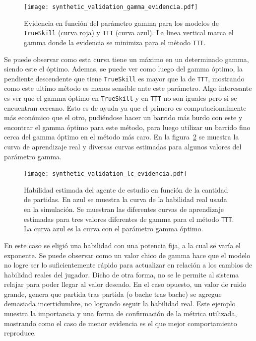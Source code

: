 \documentclass[11pt,twoside,spanish]{report} %
\begin{document}
\begin{figure}[H]
	\centering
	\texttt{[image: synthetic\_validation\_gamma\_evidencia.pdf]}
	\caption{Evidencia en funci\'on del par\'ametro gamma para los modelos de \texttt{TrueSkill} (curva roja) y \texttt{TTT} (curva azul). La linea vertical marca el gamma donde la evidencia se minimiza para el m\'etodo \texttt{TTT}.}
	\label{fig:gammaVSev}
\end{figure}

Se puede observar como esta curva tiene un m\'aximo en un determinado gamma, siendo este el \'optimo.
Ademas, se puede ver como luego del gamma \'optimo, la pendiente descendente que tiene \texttt{TrueSkill} es mayor que la de \texttt{TTT}, mostrando como este ultimo m\'etodo es menos sensible ante este par\'ametro.
Algo interesante es ver que el gamma \'optimo en \texttt{TrueSkill} y en \texttt{TTT} no son iguales pero si se encuentran cercano.
Esto es de ayuda ya que el primero es computacionalmente m\'as econ\'omico que el otro, pudi\'endose hacer un barrido m\'as burdo con este y encontrar el gamma \'optimo para este m\'etodo, para luego utilizar un barrido fino cerca del gamma \'optimo en el m\'etodo m\'as caro.
En la figura~\ref{fig:lcVSevi} se muestra la curva de aprendizaje real y diversas curvas estimadas para algunos valores del par\'ametro gamma.

\begin{figure}[H]
	\centering
	\texttt{[image: synthetic\_validation\_lc\_evidencia.pdf]}
	\caption{Habilidad estimada del agente de estudio en funci\'on de la cantidad de partidas.
	En azul se muestra la curva de la habilidad real usada en la simulaci\'on.
	Se muestran las diferentes curvas de aprendizaje estimadas para tres valores diferentes de gamma para el m\'etodo \texttt{TTT}.
	La curva azul es la curva con el par\'ametro gamma \'optimo.}
	\label{fig:lcVSevi}
\end{figure}

En este caso se eligi\'o una habilidad con una potencia fija, a la cual se var\'ia el exponente.
Se puede observar como un valor chico de gamma hace que el modelo no logre ser lo suficientemente r\'apido para actualizar en relaci\'on a los cambios de habilidad reales del jugador.
Dicho de otra forma, no se le permite al sistema relajar para poder llegar al valor deseado.
En el caso opuesto, un valor de ruido grande, genera que partida tras partida (o bache tras bache) se agregue demasiada incertidumbre, no logrando seguir la habilidad real.
Este ejemplo muestra la importancia y una forma de confirmaci\'on de la m\'etrica utilizada, mostrando como el caso de menor evidencia es el que mejor comportamiento reproduce.
\end{document}

